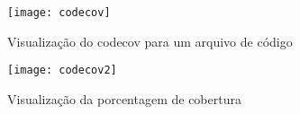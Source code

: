 \begin{figure}[ht]
    \centering
    \texttt{[image: codecov]}
    \caption{Visualização do codecov para um arquivo de código}
    \label{codecov}
\end{figure}

\begin{figure}[ht]
    \centering
    \texttt{[image: codecov2]}
    \caption{Visualização da porcentagem de cobertura}
    \label{codecov2}
\end{figure}

